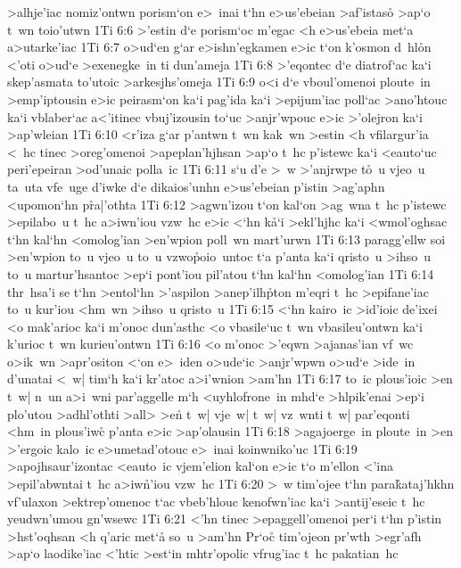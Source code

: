 >alhje'iac
nomiz'ontwn
porism`on
e>~inai
t`hn
e>us'ebeian
>af'istaso\r{}
>ap`o
t~wn
toio'utwn\bibvsend
\vs 1Ti 6:6
>'estin
d`e
porism`oc
m'egac
<h
e>us'ebeia
met`a
a>utarke'iac\bibvsend
\vs 1Ti 6:7
o>ud`en
g`ar
e>ishn'egkamen
e>ic
t`on
k'osmon
d~hl\r{o}n
<'oti
o>ud`e
>exenegke~in
ti
dun'ameja\bibvsend
\vs 1Ti 6:8
>'eqontec
d`e
diatrof`ac
ka`i
skep'asmata
to'utoic
>arkesjhs'omeja\bibvsend
\vs 1Ti 6:9
o<i
d`e
vboul'omenoi
ploute~in
>emp'iptousin
e>ic
peirasm`on
ka`i
pag'ida
ka`i
>epijum'iac
poll`ac
>ano'htouc
ka`i
vblaber`ac
a<'itinec
vbuj'izousin
to`uc
>anjr'wpouc
e>ic
>'olejron
ka`i
>ap'wleian\bibvsend
\vs 1Ti 6:10
<r'iza
g`ar
p'antwn
t~wn
kak~wn
>estin
<h
vfilargur'ia
<~hc
tinec
>oreg'omenoi
>apeplan'hjhsan
>ap`o
t~hc
p'istewc
ka`i
<eauto`uc
peri'epeiran
>od'unaic
polla~ic\bibvsend
\vs 1Ti 6:11
s`u
d'e
>~w
>'anjrwpe
t\r{o}~u
vjeo~u
ta~uta
vfe~uge
d'iwke
d`e
dikaios'unhn
e>us'ebeian
p'istin
>ag'aphn
<upomon`hn
p\r{r}a|'othta\bibvsend
{}
\vs 1Ti 6:12
>agwn'izou
t`on
kal`on
>ag~wna
t~hc
p'istewc
>epilabo~u
t~hc
a>iwn'iou
vzw~hc
e>ic
<`hn
k\r{a}`i
>ekl'hjhc
ka`i
<wmol'oghsac
t`hn
kal`hn
<omolog'ian
>en'wpion
poll~wn
mart'urwn\bibvsend
\vs 1Ti 6:13
paragg'ellw
soi
>en'wpion
to~u
vjeo~u
to~u
vzwo\r{p}oio~untoc
t`a
p'anta
ka`i
qristo~u
>ihso~u
to~u
martur'hsantoc
>ep`i
pont'iou
pil'atou
t`hn
kal`hn
<omolog'ian\bibvsend
\vs 1Ti 6:14
thr~hsa'i
se
t`hn
>entol`hn
>'aspilon
>anep'ilh\r{p}ton
m'eqri
t~hc
>epifane'iac
to~u
kur'iou
<hm~wn
>ihso~u
qristo~u\bibvsend
\vs 1Ti 6:15
<`hn
kairo~ic
>id'ioic
de'ixei
<o
mak'arioc
ka`i
m'onoc
dun'asthc
<o
vbasile`uc
t~wn
vbasileu'ontwn
ka`i
k'urioc
t~wn
kurieu'ontwn\bibvsend
\vs 1Ti 6:16
<o
m'onoc
>'eqwn
>ajanas'ian
vf~wc
o>ik~wn
>apr'ositon
<`on
e>~iden
o>ude`ic
>anjr'wpwn
o>ud`e
>ide~in
d'unatai
<~w|
tim`h
ka`i
kr'atoc
a>i'wnion
>am'hn\bibvsend
\vs 1Ti 6:17
to~ic
plous'ioic
>en
t~w|
n~un
a>i~wni
par'aggelle
m`h
<uyhlofrone~in
mhd`e
>hlpik'enai
>ep`i
plo'utou
>adhl'othti
>all>
>en\r{}
t~w|
vje~w|
t~w|
vz~wnti
t~w|
par'eqonti
<hm~in
plous'iwc\r{}
p'anta
e>ic
>ap'olausin\bibvsend
\vs 1Ti 6:18
>agajoerge~in
ploute~in
>en
>'ergoic
kalo~ic
e>umetad'otouc
e>~inai
koinwniko'uc\bibvsend
\vs 1Ti 6:19
>apojhsaur'izontac
<eauto~ic
vjem'elion
kal`on
e>ic
t`o
m'ellon
<'ina
>epil'abwntai
t~hc
a>iw\r{n}'iou
vzw~hc\bibvsend
\vs 1Ti 6:20
>~w
tim'ojee
t`hn
para\r{k}ataj'hkhn
vf'ulaxon
>ektrep'omenoc
t`ac
vbeb'hlouc
kenofwn'iac
ka`i
>antij'eseic
t~hc
yeudwn'umou
gn'wsewc\bibvsend
\vs 1Ti 6:21
<'hn
tinec
>epaggell'omenoi
per`i
t`hn
p'istin
>hst'oqhsan
<h
q'aric
met`a\r{}
so~u
>am'hn\bibvsend
Pr`oc\r{}
tim'ojeon
pr'wth
>egr'afh
>ap`o
laodike'iac
<'htic
>est`in
mhtr'opolic
vfrug'iac
t~hc
pakatian~hc\bibvsend

